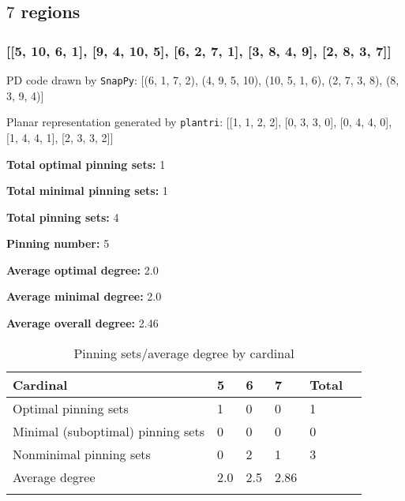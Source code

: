 \documentclass{article}%
\begin{document}
\newpage

\subsection{$7$ regions}

\subsubsection{[[5, 10, 6, 1], [9, 4, 10, 5], [6, 2, 7, 1], [3, 8, 4, 9], [2, 8, 3, 7]]}

{\small\noindent PD code drawn by \texttt{SnapPy}: [(6, 1, 7, 2), (4, 9, 5, 10), (10, 5, 1, 6), (2, 7, 3, 8), (8, 3, 9, 4)]}

{\small\noindent Planar representation generated by \texttt{plantri}: [[1, 1, 2, 2], [0, 3, 3, 0], [0, 4, 4, 0], [1, 4, 4, 1], [2, 3, 3, 2]]}

\begin{multicols}{2}
{\normalsize \noindent\textbf{Total optimal pinning sets:} 1

\noindent\textbf{Total minimal pinning sets:} 1

\noindent\textbf{Total pinning sets:} 4

\noindent\textbf{Pinning number:} 5

}
\columnbreak

{\normalsize \noindent\textbf{Average optimal degree:} 2.0

\noindent\textbf{Average minimal degree:} 2.0

\noindent\textbf{Average overall degree:} 2.46

}
\end{multicols}

\begin{table}[ht]
	\caption{Pinning sets/average degree by cardinal}
	\centering
	\renewcommand{\arraystretch}{1.5}
	\begin{tabularx}{\textwidth}{lXXXXX}
		\toprule
			Cardinal & 5 & 6 & 7 & Total\\
			\hline
			Optimal pinning sets & 1 & 0 & 0 & 1 \\
			Minimal (suboptimal) pinning sets & 0 & 0 & 0 & 0 \\
			Nonminimal pinning sets & 0 & 2 & 1 & 3 \\
			Average degree & 2.0 & 2.5 & 2.86 &  \\
		\bottomrule \\ 
	\end{tabularx}
\end{table}
\end{document}
